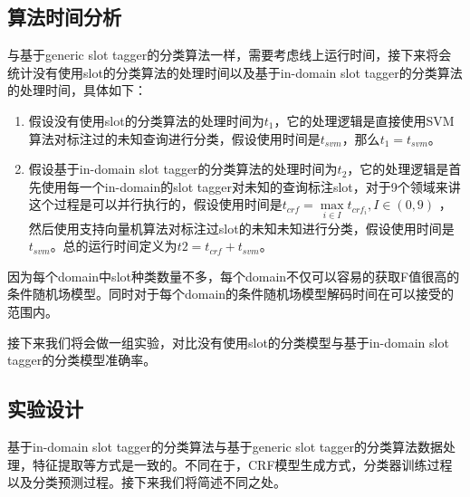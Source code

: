\documentclass[master]{njuthesis}
\begin{document}
\subsection{算法时间分析}
    
    与基于generic slot tagger的分类算法一样，需要考虑线上运行时间，接下来将会统计没有使用slot的分类算法的处理时间以及基于in-domain slot tagger的分类算法的处理时间，具体如下：
   \begin{enumerate}
     \item 假设没有使用slot的分类算法的处理时间为$t_1$，它的处理逻辑是直接使用SVM算法对标注过的未知查询进行分类，假设使用时间是$t_{svm}$，那么$t_1 = t_{svm}$。
     \item 假设基于in-domain slot tagger的分类算法的处理时间为$t_2$，它的处理逻辑是首先使用每一个in-domain的slot tagger对未知的查询标注slot，对于9个领域来讲这个过程是可以并行执行的，假设使用时间是$t_{crf}=\max\limits_{i \in I} t_{{crf}_i},I \in (0,9)$ ，然后使用支持向量机算法对标注过slot的未知未知进行分类，假设使用时间是$t_{svm}$。总的运行时间定义为$t2 = t_{crf} + t_{svm}$。
   \end{enumerate}

    因为每个domain中slot种类数量不多，每个domain不仅可以容易的获取F值很高的条件随机场模型。同时对于每个domain的条件随机场模型解码时间在可以接受的范围内。
    
    接下来我们将会做一组实验，对比没有使用slot的分类模型与基于in-domain slot tagger的分类模型准确率。

\subsection{实验设计}
    
    基于in-domain slot tagger的分类算法与基于generic slot tagger的分类算法数据处理，特征提取等方式是一致的。不同在于，CRF模型生成方式，分类器训练过程以及分类预测过程。接下来我们将简述不同之处。\\
\\
\end{document}

